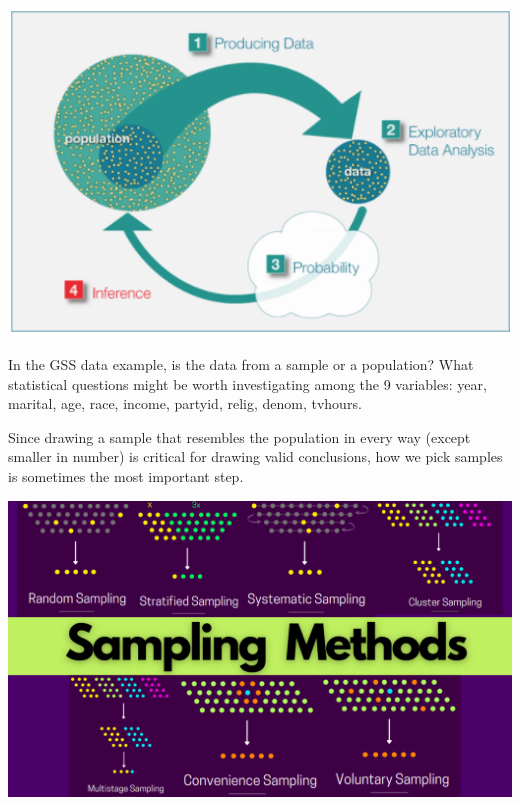 \begin{center}
\includegraphics[width=6in]{01/fig-inference.png} %
\end{center}

\bb[resume]
\ii In the GSS data example, is the data from a sample or a population? \vfill
\ii What statistical questions might be worth investigating among the 9 variables: year, marital, age, race, income, partyid, relig, denom, tvhours. \vfill
\ee

\clearpage



Since drawing a sample that resembles the population in every way (except smaller in number) is critical for drawing valid conclusions, how we pick samples is sometimes the most important step.


\begin{center}
\includegraphics[width=6in]{01/fig-sampling-methods.png}
\end{center}

